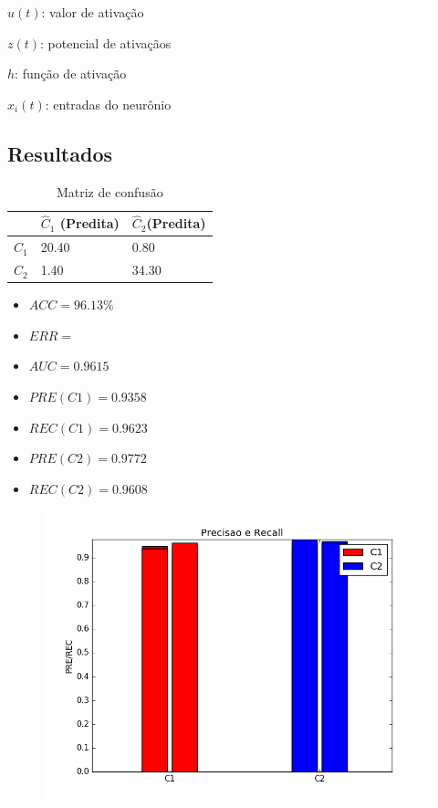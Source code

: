 \documentclass[11pt,a4paper]{article}
\numberwithin{equation}{section}
\begin{document}
$u(t)$: valor de ativação

$z(t)$: potencial de ativaçãos

$h$: função de ativação

$x_i(t)$: entradas do neurônio


\subsection{Resultados}

\begin{table}[H]
\centering
\caption{Matriz de confusão}
\begin{tabular}{l l l}
\hline
 & \textbf{$\hat{C}_1$ (Predita)} & \textbf{$\hat{C}_2$(Predita)}\\
\hline
$C_1$ & 20.40&0.80\\ 
$C_2$ & 1.40&34.30\\ 
\hline
\end{tabular}
\end{table}

\begin{minipage}{.5\textwidth}
\begin{itemize}
\item $ACC = 96.13 \%$
\item $ERR =  $
\item $AUC = 0.9615 $
\item $PRE(C1) = 0.9358$
\item $REC(C1) = 0.9623$
\item $PRE(C2) = 0.9772$
\item $REC(C2) = 0.9608$
\end{itemize}
\end{minipage}%
\begin{minipage}{.5\textwidth}
\begin{figure}[H]
\centering
  \includegraphics[width=\linewidth]{../img/perc_rec.png}
  \label{fig:percep}
\end{figure}
\end{minipage}%
\end{document}
